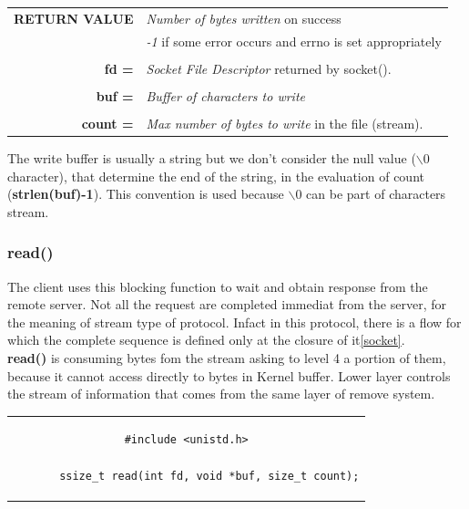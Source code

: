 \begin{table}[h]
\centering
\begin{tabular}{rcl}
\textbf{RETURN VALUE} & \multicolumn{2}{l}{\textit{Number of bytes written} on success}\\
{} & \multicolumn{2}{l}{\textit{-1} if some error occurs and errno is set appropriately}\\
& & \\
\textbf{fd =} & \multicolumn{2}{l}{\textit{Socket File Descriptor} returned by socket().}\\
& &\\
\textbf{buf =} & \multicolumn{2}{l}{\textit{Buffer of characters to write}}\\
& & \\
\textbf{count =} & \multicolumn{2}{l}{\textit{Max number of bytes to write} in the file (stream).}\\
\end{tabular}
\end{table}
\vspace{4cm}
The write buffer is usually a string but we don't consider the null value (\textbf{$\backslash 0$} character), that determine the end of the string, in the evaluation of count (\textbf{strlen(buf)-1}). This convention is used because \textbf{$\backslash 0$} can be part of characters stream.\\

\subsubsection{read()}
The client uses this blocking function to wait and obtain response from the remote server. Not all the request are completed immediat from the server, for the meaning of stream type of protocol. Infact in this protocol, there is a flow for which the complete sequence is defined only at the closure of it\ref{socket}.\\
\textbf{read()} is consuming bytes fom the stream asking to level 4 a portion of them, because it cannot access directly to bytes in Kernel buffer. Lower layer controls the stream of information that comes from the same layer of remove system.\\

\begin{center}
\begin{tabular}{c}
\begin{lstlisting}[linewidth=280pt, basicstyle=\footnotesize\sffamily,]
#include <unistd.h>

       ssize_t read(int fd, void *buf, size_t count);
\end{lstlisting}
\end{tabular}
\end{center}

